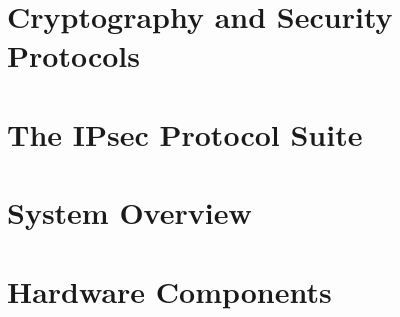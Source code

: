 \documentclass[a4paper,12pt,twoside]{book}
\author{\me}
\begin{document}
\setcounter{page}{3}



\clearemptydoublepage

% 

% 


\clearemptydoublepage


\clearemptydoublepage

\pagestyle{empty}

{\hypersetup{linkcolor=black}
\tableofcontents
}
\clearemptydoublepage

\listoffigures
\listoftables
\printglossaries
\clearemptydoublepage

\mainmatter %
\clearemptydoublepage


\pagestyle{fancy}
\setcounter{page}{1}



\clearemptydoublepage

\chapter{Cryptography and Security Protocols}\label{ch:chap2}

\clearemptydoublepage

\chapter{The IPsec Protocol Suite}\label{ch:chap3}

\clearemptydoublepage

\chapter{System Overview}\label{ch:chap4}

\clearemptydoublepage

\chapter{Hardware Components}\label{ch:chap5}

\clearemptydoublepage
\end{document}
